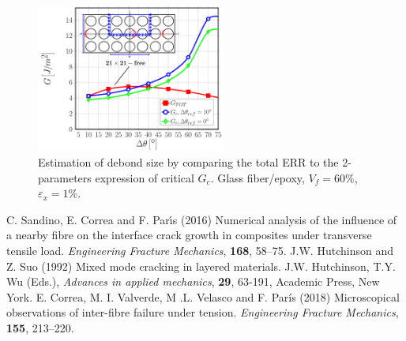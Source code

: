 \documentclass[12pt,a4paper]{article}
\begin{document}
\begin{figure}[h]
\centering\includegraphics[width=0.551\textwidth]{vf60-GTOT.pdf}
\caption{Estimation of debond size by comparing the total ERR to the 2-parameters expression of critical $G_{c}$. Glass fiber/epoxy, $V_{f}=60\%$, $\varepsilon_{x}=1\%$.}
\label{fig:sizeesti}
\end{figure}

\begin{thebibliography}{9}
%
%
 C. Sandino, E. Correa and F. Par{\'{\i}}s (2016) Numerical analysis of the influence of a nearby fibre on the interface crack growth in composites under transverse tensile load. \textit{Engineering Fracture Mechanics}, \textbf{168}, 58--75.
 J.W. Hutchinson and Z. Suo (1992) Mixed mode cracking in layered materials. J.W. Hutchinson, T.Y. Wu (Eds.), \textit{Advances in applied mechanics}, \textbf{29}, 63-191, Academic Press, New York.
 E. Correa, M. I. Valverde, M .L. Velasco and F. París (2018) Microscopical observations of inter-fibre failure under tension. \textit{Engineering Fracture Mechanics}, \textbf{155}, 213--220.
%
\end{thebibliography}
\end{document}
